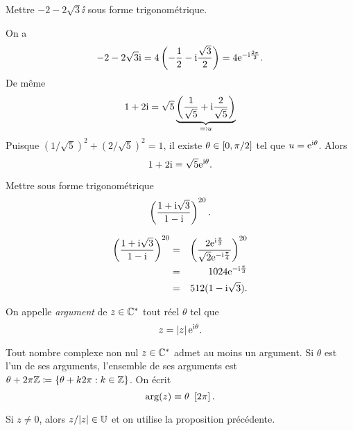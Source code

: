 \documentclass{magnolia}
\begin{document}
\begin{exos}
  \exo Mettre $-2-2\sqrt{3}\ii$ sous forme trigonométrique. %
  \begin{sol}
  On a
  \[-2-2\sqrt{3}{\rm i}=4\left(-\frac{1}{2}-{\rm i}\frac{\sqrt{3}}{2}\right)=4{\rm e}^{-{\rm i}\frac{2\pi}{3}}.\]
  De même
  \[1+2{\rm i}=\sqrt{5}\underbrace{\left(\frac{1}{\sqrt{5}}+{\rm i}\frac{2}{\sqrt{5}}\right)}_{\eqqcolon u}\]
  Puisque $(1/\sqrt{5})^2+(2/\sqrt{5})^2=1$, il existe $\theta\in\left[0,\pi/2\right]$ tel que $u={\rm e}^{{\rm i}\theta}$. Alors
  \[1+2{\rm i}=\sqrt{5}{\rm e}^{{\rm i}\theta}.\]
  \end{sol}
  \exo Mettre sous forme trigonométrique
    \[\left(\frac{1+{\rm i} \sqrt{3}}{1-{\rm i}}\right)^{20}.\]
  \begin{sol}
  \begin{eqnarray*}
  \left(\frac{1+{\rm i} \sqrt{3}}{1-{\rm i}}\right)^{20}
  &=& \left(\frac{2{\rm e}^{{\rm i}\frac{\pi}{3}}}{\sqrt{2}{\rm e}^{-{\rm i}\frac{\pi}{4}}}\right)^{20}\\
  &=& 1024{\rm e}^{-{\rm i}\frac{\pi}{3}}\\
  &=& 512(1-{\rm i}\sqrt{3}).
  \end{eqnarray*}
  \end{sol}
  \end{exos}



\begin{definition}[utile=-3]
On appelle \emph{argument} de $z\in\mathbb{C}^*$ tout réel
$\theta$ tel que
\[z=\left|z\right|{\rm e}^{{\rm i}\theta}.\]
\end{definition}

\begin{proposition}[utile=-3]
Tout nombre complexe non nul $z\in\mathbb{C}^*$ admet au moins un argument. Si $\theta$ est l'un de ses arguments, l'ensemble de ses arguments est
$\theta+2\pi\mathbb{Z}\coloneqq\left\{\theta+k2\pi : k\in\mathbb{Z}\right\}$. On écrit
\[\arg(z)\equiv\theta\ \cro{2\pi}.\]
\end{proposition}

\begin{preuve}
Si $z\neq 0$, alors $z/|z| \in \U$ et on utilise la proposition précédente.
\end{preuve}
\end{document}
